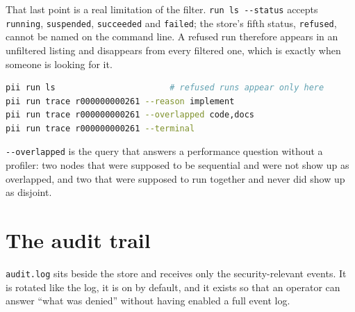 \begin{center}
\begin{minipage}{\linewidth}
\centering
{}
\end{minipage}
\end{center}

That last point is a real limitation of the filter. \texttt{run ls -{}-status} accepts
\texttt{running}, \texttt{suspended}, \texttt{succeeded} and \texttt{failed}; the store's
fifth status, \texttt{refused}, cannot be named on the command line. A refused run therefore
appears in an unfiltered listing and disappears from every filtered one, which is exactly
when someone is looking for it.

\begin{lstlisting}[language=bash]
pii run ls                       # refused runs appear only here
pii run trace r000000000261 --reason implement
pii run trace r000000000261 --overlapped code,docs
pii run trace r000000000261 --terminal
\end{lstlisting}

\texttt{-{}-overlapped} is the query that answers a performance question without a profiler:
two nodes that were supposed to be sequential and were not show up as overlapped, and two
that were supposed to run together and never did show up as disjoint.

\section{The audit trail}

\texttt{audit.log} sits beside the store and receives only the security-relevant events. It is
rotated like the log, it is on by default, and it exists so that an operator can answer
\enquote{what was denied} without having enabled a full event log.

